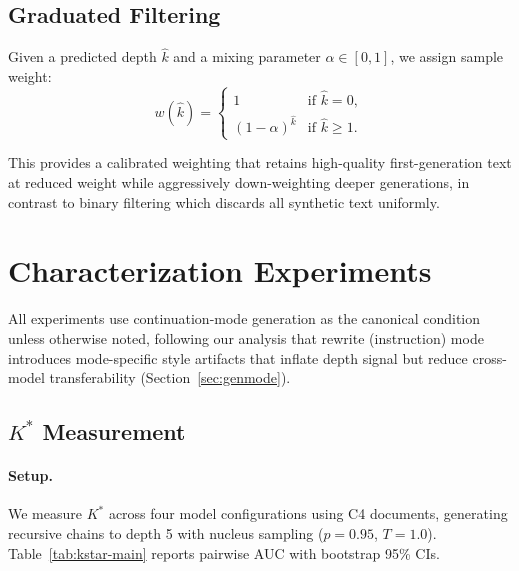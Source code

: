 \documentclass[11pt,a4paper]{article}
\newcommand{\Kstar}{K^{*}}
\begin{document}
\subsection{Graduated Filtering}
\label{sec:graduated}

Given a predicted depth $\hat{k}$ and a mixing parameter $\alpha \in [0,1]$, we assign sample weight:
\begin{equation}
    w(\hat{k}) = \begin{cases}
    1 & \text{if } \hat{k} = 0, \\
    (1 - \alpha)^{\hat{k}} & \text{if } \hat{k} \geq 1.
    \end{cases}
    \label{eq:graduated}
\end{equation}

This provides a calibrated weighting that retains high-quality first-generation text at reduced weight while aggressively down-weighting deeper generations, in contrast to binary filtering which discards all synthetic text uniformly.

\section{Characterization Experiments}
\label{sec:characterization}

All experiments use continuation-mode generation as the canonical condition unless otherwise noted, following our analysis that rewrite (instruction) mode introduces mode-specific style artifacts that inflate depth signal but reduce cross-model transferability (Section~\ref{sec:genmode}).

\subsection{$\Kstar$ Measurement}
\label{sec:kstar-measurement}

\paragraph{Setup.}
We measure $\Kstar$ across four model configurations using C4 documents, generating recursive chains to depth 5 with nucleus sampling ($p=0.95$, $T=1.0$).
Table~\ref{tab:kstar-main} reports pairwise AUC with bootstrap 95\% CIs.
\end{document}
